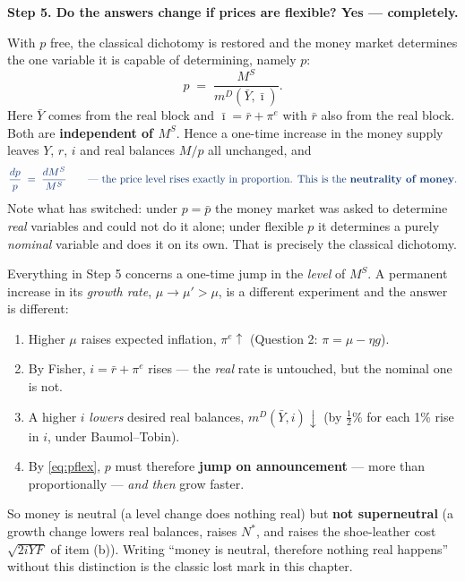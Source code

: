 \documentclass[11pt, a4paper]{article}
\newcommand{\passo}[1]{\medskip\noindent\textbf{#1}\par\nobreak}
\newcommand{\resp}[1]{%
  \ifmmode {\color{darkblue}#1}\else\textcolor{darkblue}{\textbf{#1}}\fi}
\newcommand{\pb}{\bar p}
\newcommand{\Ms}{M^{S}}
\newcommand{\md}{m^{D}}
\newcommand{\Nst}{N^{\ast}}
\begin{document}
\passo{Step 5. Do the answers change if prices are flexible? Yes --- completely.}
With $p$ free, the classical dichotomy is restored and the money market determines the one
variable it is capable of determining, namely $p$:
\begin{equation}
p \;=\; \frac{\Ms}{\md(\bar Y,\bar\imath)} .
\label{eq:pflex}
\end{equation}
Here $\bar Y$ comes from the real block and $\bar\imath=\bar r+\pi^{e}$ with $\bar r$ also
from the real block. Both are \textbf{independent of $\Ms$}. Hence a one-time increase in the
money supply leaves $Y$, $r$, $i$ and real balances $M/p$ all unchanged, and
\[
\resp{\frac{dp}{p} \;=\; \frac{d\Ms}{\Ms}\qquad\text{--- the price level rises exactly in
proportion. This is the \textbf{neutrality of money}.}}
\]
Note what has switched: under $p=\pb$ the money market was asked to determine \emph{real}
variables and could not do it alone; under flexible $p$ it determines a purely \emph{nominal}
variable and does it on its own. That is precisely the classical dichotomy.

\begin{tcolorbox}[trapbox, title={Neutrality is not superneutrality --- the second experiment}]
\small
Everything in Step 5 concerns a one-time jump in the \emph{level} of $\Ms$. A permanent
increase in its \emph{growth rate}, $\mu\to\mu'>\mu$, is a different experiment and the answer
is different:
\begin{enumerate}[label=\arabic*.]
\item Higher $\mu$ raises expected inflation, $\pi^{e}\uparrow$ (Question 2: $\pi=\mu-\eta g$).
\item By Fisher, $i=\bar r+\pi^{e}$ rises --- the \emph{real} rate is untouched, but the
      nominal one is not.
\item A higher $i$ \emph{lowers} desired real balances, $\md(\bar Y,i)\downarrow$ (by
      $\tfrac12$\% for each 1\% rise in $i$, under Baumol--Tobin).
\item By \eqref{eq:pflex}, $p$ must therefore \textbf{jump on announcement} --- more than
      proportionally --- \emph{and then} grow faster.
\end{enumerate}
So money is neutral (a level change does nothing real) but \textbf{not superneutral} (a growth
change lowers real balances, raises $\Nst$, and raises the shoe-leather cost $\sqrt{2iYF}$ of
item (b)). Writing ``money is neutral, therefore nothing real happens'' without this
distinction is the classic lost mark in this chapter.
\end{tcolorbox}
\end{document}
